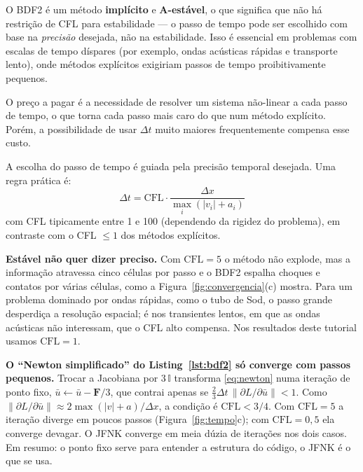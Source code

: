 \documentclass[10pt,a4paper]{article}
\newcommand{\ub}{\bar u}
\begin{document}
\begin{intuicao}
O BDF2 é um método \textbf{implícito} e \textbf{A-estável}, o que significa que não há restrição de CFL para estabilidade --- o passo de tempo pode ser escolhido com base na \emph{precisão} desejada, não na estabilidade. Isso é essencial em problemas com escalas de tempo díspares (por exemplo, ondas acústicas rápidas e transporte lento), onde métodos explícitos exigiriam passos de tempo proibitivamente pequenos.

O preço a pagar é a necessidade de resolver um sistema não-linear a cada passo de tempo, o que torna cada passo mais caro do que num método explícito. Porém, a possibilidade de usar $\Delta t$ muito maiores frequentemente compensa esse custo.
\end{intuicao}

A escolha do passo de tempo é guiada pela precisão temporal desejada. Uma regra prática é:
\begin{equation}\label{eq:cfl}
\Delta t=\mathrm{CFL}\cdot\frac{\Delta x}{\max_i(|v_i|+a_i)}
\end{equation}
com CFL tipicamente entre 1 e 100 (dependendo da rigidez do problema), em contraste com o CFL $\le1$ dos métodos explícitos.

\begin{atencao}
\textbf{Estável não quer dizer preciso.} Com $\mathrm{CFL}=5$ o método não explode, mas a informação atravessa cinco células por passo e o BDF2 espalha choques e contatos por várias células, como a Figura~\ref{fig:convergencia}(c) mostra. Para um problema dominado por ondas rápidas, como o tubo de Sod, o passo grande desperdiça a resolução espacial; é nos transientes lentos, em que as ondas acústicas não interessam, que o CFL alto compensa. Nos resultados deste tutorial usamos $\mathrm{CFL}=1$.

\textbf{O ``Newton simplificado'' do Listing~\ref{lst:bdf2} só converge com passos pequenos.} Trocar a Jacobiana por $3\,\mathbb{I}$ transforma \eqref{eq:newton} numa iteração de ponto fixo, $\ub\leftarrow\ub-\mathbf{F}/3$, que contrai apenas se $\tfrac23\Delta t\,\|\partial L/\partial\ub\|<1$. Como $\|\partial L/\partial\ub\|\approx2\max(|v|+a)/\Delta x$, a condição é $\mathrm{CFL}<3/4$. Com $\mathrm{CFL}=5$ a iteração diverge em poucos passos (Figura~\ref{fig:tempo}c); com $\mathrm{CFL}=0{,}5$ ela converge devagar. O JFNK converge em meia dúzia de iterações nos dois casos. Em resumo: o ponto fixo serve para entender a estrutura do código, o JFNK é o que se usa.
\end{atencao}
\end{document}
